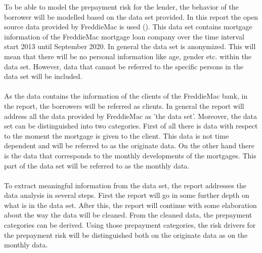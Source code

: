 To be able to model the prepayment risk for the lender, the behavior of 
the borrower will be modelled based on the data set provided. In this report
the open source data provided by FreddieMac is used (\cite{FredieMac}). This data set contains mortgage information of the FreddieMac mortgage loan company over the time
interval start 2013 until September 2020. In general the data set is anonymized.
This will mean that there will be no personal information like age, gender etc. within the data set.
However, data that cannot be referred to the specific persons in the data set
will be included.
\\\\
As the data contains the information of the clients of the FreddieMac bank, in 
the report, the borrowers will be referred as clients. In general the report will 
address all the data provided by FreddieMac as 'the data set'. Moreover, the 
data set can be distinguished into two categories. First of all there is data 
with respect to the moment the mortgage is given to the client. This data is not time 
dependent and will be referred to as the originate data. On the other hand 
there is the data that corresponds to the monthly developments of the 
mortgages. This part of the data set will be referred to as the monthly 
data.
\\\\
To extract meaningful information from the data set, the report addresses 
the data analysis in several steps. First the report will go in some 
further depth on what is in the data set. After this, the report will 
continue with some elaboration about the way the data will be cleaned. 
From the cleaned data, the prepayment categories can be derived. Using those  prepayment categories, the risk drivers for the prepayment risk 
will be distinguished both on the originate data as on the monthly data.  

